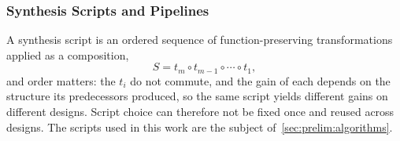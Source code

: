 \subsubsection{Synthesis Scripts and Pipelines}
\label{sec:prelim:synthesis:scripts}
A synthesis script is an ordered sequence of function-preserving transformations applied
as a composition,
\begin{equation}
    S = t_m \circ t_{m-1} \circ \cdots \circ t_1,
    \label{eq:prelim:script}
\end{equation}
and order matters: the $t_i$ do not commute, and the gain of each depends on the structure
its predecessors produced, so the same script yields different gains on different designs.
Script choice can therefore not be fixed once and reused across designs. The scripts used
in this work are the subject of~\ref{sec:prelim:algorithms}.
